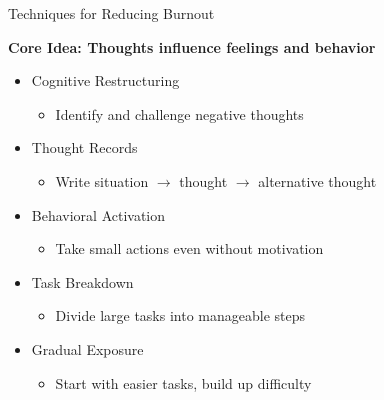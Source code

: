 \documentclass[dvipsnames]{beamer}
\begin{document}
\begin{frame}{Techniques for Reducing Burnout}

\textbf{Core Idea: Thoughts influence feelings and behavior}



\begin{itemize}
    \item Cognitive Restructuring
    \begin{itemize}
        \item Identify and challenge negative thoughts
    \end{itemize}
    
    
    
    \item Thought Records
    \begin{itemize}
        \item Write situation $\rightarrow$ thought $\rightarrow$ alternative thought
    \end{itemize}
    
    
    
    \item Behavioral Activation
    \begin{itemize}
        \item Take small actions even without motivation
    \end{itemize}
    \end{itemize}

    \end{frame}
    \begin{frame}
    \begin{itemize}

    
    \item Task Breakdown
    \begin{itemize}
        \item Divide large tasks into manageable steps
    \end{itemize}
    
    
    
    \item Gradual Exposure
    \begin{itemize}
        \item Start with easier tasks, build up difficulty
    \end{itemize}
\end{itemize}

\end{frame}
\end{document}
